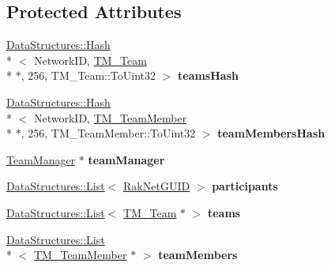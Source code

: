 \subsection*{Protected Attributes}
\begin{DoxyCompactItemize}
\item 
\hypertarget{class_rak_net_1_1_t_m___world_a8907d1b8e48063f52f81aa5e767ba66b}{\hyperlink{class_data_structures_1_1_hash}{Data\-Structures\-::\-Hash}\\*
$<$ Network\-I\-D, \hyperlink{class_rak_net_1_1_t_m___team}{T\-M\-\_\-\-Team} \\*
$\ast$, 256, T\-M\-\_\-\-Team\-::\-To\-Uint32 $>$ {\bfseries teams\-Hash}}\label{class_rak_net_1_1_t_m___world_a8907d1b8e48063f52f81aa5e767ba66b}

\item 
\hypertarget{class_rak_net_1_1_t_m___world_a09e7c7b15ae9af1b052ad39096ba27b5}{\hyperlink{class_data_structures_1_1_hash}{Data\-Structures\-::\-Hash}\\*
$<$ Network\-I\-D, \hyperlink{class_rak_net_1_1_t_m___team_member}{T\-M\-\_\-\-Team\-Member} \\*
$\ast$, 256, T\-M\-\_\-\-Team\-Member\-::\-To\-Uint32 $>$ {\bfseries team\-Members\-Hash}}\label{class_rak_net_1_1_t_m___world_a09e7c7b15ae9af1b052ad39096ba27b5}

\item 
\hypertarget{class_rak_net_1_1_t_m___world_a35c3b0a122484a4180850696a83eaebc}{\hyperlink{class_rak_net_1_1_team_manager}{Team\-Manager} $\ast$ {\bfseries team\-Manager}}\label{class_rak_net_1_1_t_m___world_a35c3b0a122484a4180850696a83eaebc}

\item 
\hypertarget{class_rak_net_1_1_t_m___world_aca5f691326c121fcbde389950fd8d8f5}{\hyperlink{class_data_structures_1_1_list}{Data\-Structures\-::\-List}$<$ \hyperlink{struct_rak_net_1_1_rak_net_g_u_i_d}{Rak\-Net\-G\-U\-I\-D} $>$ {\bfseries participants}}\label{class_rak_net_1_1_t_m___world_aca5f691326c121fcbde389950fd8d8f5}

\item 
\hypertarget{class_rak_net_1_1_t_m___world_ad79d953fb9b832d562a733c6d64d5efb}{\hyperlink{class_data_structures_1_1_list}{Data\-Structures\-::\-List}$<$ \hyperlink{class_rak_net_1_1_t_m___team}{T\-M\-\_\-\-Team} $\ast$ $>$ {\bfseries teams}}\label{class_rak_net_1_1_t_m___world_ad79d953fb9b832d562a733c6d64d5efb}

\item 
\hypertarget{class_rak_net_1_1_t_m___world_a3547d192f9a5a5b12b2b085b3a0749ee}{\hyperlink{class_data_structures_1_1_list}{Data\-Structures\-::\-List}\\*
$<$ \hyperlink{class_rak_net_1_1_t_m___team_member}{T\-M\-\_\-\-Team\-Member} $\ast$ $>$ {\bfseries team\-Members}}\label{class_rak_net_1_1_t_m___world_a3547d192f9a5a5b12b2b085b3a0749ee}


\end{DoxyCompactItemize}

